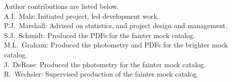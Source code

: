 Author contributions are listed below. \\
A.I.~Malz: Initiated project, led development work. \\
P.J.~Marshall: Advised on statistics, and project design and management. \\
S.J.~Schmidt: Produced the PDFs for the fainter mock catalog. \\
M.L.~Graham: Produced the photometry and PDFs for the brighter mock catalog. \\
J.~DeRose: Produced the photometry for the fainter mock catalog. \\
R.~Wechsler: Supervised production of the fainter mock catalog. \\
